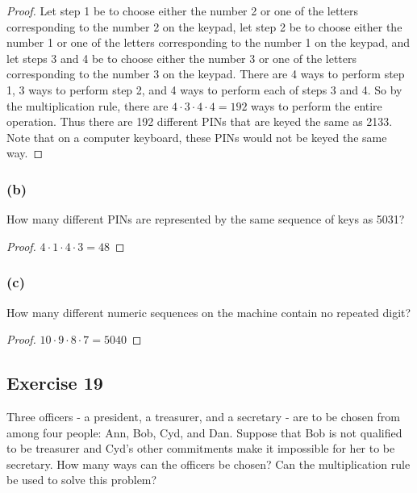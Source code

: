 \documentclass[14pt]{extarticle}
\begin{document}
\begin{proof}
Let step 1 be to choose either the number 2 or one of the letters corresponding to the number 2 on the keypad, let 
step 2 be to choose either the number 1 or one of the letters corresponding to the number 1 on the keypad, and 
let steps 3 and 4 be to choose either the number 3 or one of the letters corresponding to the number 3 on the keypad. 
There are 4 ways to perform step 1, 3 ways to perform step 2, and 4 ways to perform each of steps 3 and 4. So by the 
multiplication rule, there are \(4 \cdot 3 \cdot 4 \cdot 4 = 192\) ways to perform the entire operation. Thus there 
are 192 different PINs that are keyed the same as 2133. Note that on a computer keyboard, these PINs would not be 
keyed the same way.
\end{proof}

\subsubsection{(b)}
How many different PINs are represented by the same sequence of keys as 5031?

\begin{proof}
\(4 \cdot 1 \cdot 4 \cdot 3 = 48\)
\end{proof}

\subsubsection{(c)}
How many different numeric sequences on the machine contain no repeated digit?

\begin{proof}
\(10 \cdot 9 \cdot 8 \cdot 7 = 5040\)
\end{proof}

\subsection{Exercise 19}
Three officers - a president, a treasurer, and a secretary - are to be chosen from among four people: Ann, Bob, Cyd, 
and Dan. Suppose that Bob is not qualified to be treasurer and Cyd’s other commitments make it impossible for her to 
be secretary. How many ways can the officers be chosen? Can the multiplication rule be used to solve this problem?
\end{document}
